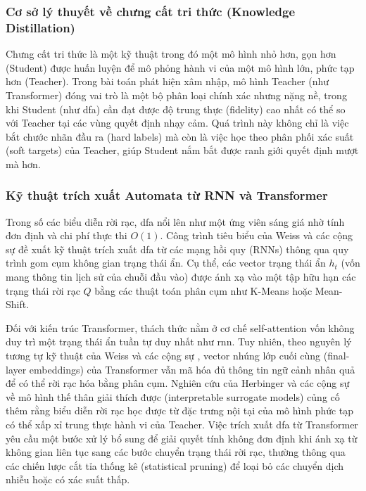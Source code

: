 \documentclass[../main.tex]{subfiles}
\begin{document}
\subsubsection{Cơ sở lý thuyết về chưng cất tri thức (Knowledge Distillation)}
Chưng cất tri thức \cite{hinton2015distilling} là một kỹ thuật trong đó một mô hình nhỏ hơn, gọn
hơn (Student) được huấn luyện để mô phỏng hành vi của một mô hình
lớn, phức tạp hơn (Teacher). Trong bài toán phát hiện xâm nhập, mô
hình Teacher (như Transformer) đóng vai trò là một bộ phân loại chính
xác nhưng nặng nề, trong khi Student (như \gls{dfa}) cần đạt được độ trung
thực (fidelity) cao nhất có thể so với Teacher tại các vùng quyết
định nhạy cảm. Quá trình này không chỉ là việc bắt chước nhãn đầu ra
(hard labels) mà còn là việc học theo phân phối xác suất (soft
targets) của Teacher, giúp Student nắm bắt được ranh giới quyết định
mượt mà hơn.

\subsubsection{Kỹ thuật trích xuất Automata từ RNN và Transformer}
Trong số các biểu diễn rời rạc, \gls{dfa} nổi
lên như một ứng viên sáng giá nhờ tính đơn định và chi phí thực thi
$O(1)$. Công trình tiêu biểu của Weiss và các cộng sự
\cite{weiss2018extracting} đề xuất kỹ thuật trích xuất \gls{dfa} từ các mạng
hồi quy (RNNs) thông qua quy trình gom cụm không gian trạng thái ẩn.
Cụ thể, các vector trạng thái ẩn $h_t$ (vốn mang thông tin lịch sử
của chuỗi đầu vào) được ánh xạ vào một tập hữu hạn các trạng thái rời
rạc $Q$ bằng các thuật toán phân cụm như K-Means hoặc Mean-Shift.

Đối với kiến trúc Transformer, thách thức nằm ở cơ chế self-attention
vốn không duy trì một trạng thái ẩn tuần tự duy nhất như \gls{rnn}. Tuy
nhiên, theo nguyên lý tương tự kỹ thuật của Weiss và các cộng sự
\cite{weiss2018extracting}, vector nhúng lớp cuối cùng (final-layer
embeddings) của Transformer vẫn mã hóa đủ thông tin ngữ cảnh nhân
quả để có thể rời rạc hóa bằng phân cụm. Nghiên cứu của Herbinger và
các cộng sự \cite{herbinger2023leveraging} về mô hình thế thân giải
thích được (interpretable surrogate models) củng cố thêm rằng biểu
diễn rời rạc học được từ đặc trưng nội tại của mô hình phức tạp có
thể xấp xỉ trung thực hành vi của Teacher. Việc trích xuất \gls{dfa} từ Transformer yêu
cầu một bước xử lý bổ sung để giải quyết tính không đơn định khi ánh
xạ từ không gian liên tục sang các bước chuyển trạng thái rời rạc,
thường thông qua các chiến lược cắt tỉa thống kê (statistical
pruning) để loại bỏ các chuyển dịch nhiễu hoặc có xác suất thấp.
\end{document}
